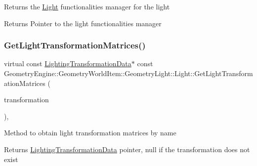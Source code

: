 Returns the \mbox{\hyperlink{class_geometry_engine_1_1_geometry_world_item_1_1_geometry_light_1_1_light}{Light}} functionalities manager for the light \begin{DoxyReturn}{Returns}
Pointer to the light functionalities manager 
\end{DoxyReturn}
\mbox{\label{class_geometry_engine_1_1_geometry_world_item_1_1_geometry_light_1_1_light_a332c999d4f704855683e079d99b563b2}} 
\subsubsection{\texorpdfstring{GetLightTransformationMatrices()}{GetLightTransformationMatrices()}}
{\footnotesize\ttfamily virtual const \mbox{\hyperlink{class_geometry_engine_1_1_lighting_transformation_data}{Lighting\+Transformation\+Data}}$\ast$ const Geometry\+Engine\+::\+Geometry\+World\+Item\+::\+Geometry\+Light\+::\+Light\+::\+Get\+Light\+Transformation\+Matrices (\begin{DoxyParamCaption}\item[{Light\+Transformation\+Matrices}]{transformation }\end{DoxyParamCaption})\hspace{0.3cm}{\ttfamily [inline]}, {\ttfamily [virtual]}}

Method to obtain light transformation matrices by name \begin{DoxyReturn}{Returns}
\mbox{\hyperlink{class_geometry_engine_1_1_lighting_transformation_data}{Lighting\+Transformation\+Data}} pointer, null if the transformation does not exist 
\end{DoxyReturn}
\mbox{\label{class_geometry_engine_1_1_geometry_world_item_1_1_geometry_light_1_1_light_a18009ba6ef9c788f3d33d1ebd78a2140}} 
